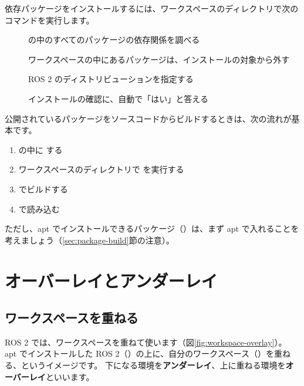 依存パッケージをインストールするには、ワークスペースのディレクトリで次のコマンドを実行します。


\begin{description}
  \item[]  の中のすべてのパッケージの依存関係を調べる
  \item[] ワークスペースの中にあるパッケージは、インストールの対象から外す
  \item[] ROS 2 のディストリビューションを指定する
  \item[] インストールの確認に、自動で「はい」と答える
\end{description}

\begin{point}[ソースからビルドするときの手順]
  公開されているパッケージをソースコードからビルドするときは、次の流れが基本です。
  \begin{enumerate}
    \item {} の中に  する
    \item ワークスペースのディレクトリで  を実行する
    \item {} でビルドする
    \item {} で読み込む
  \end{enumerate}
  ただし、apt でインストールできるパッケージ（）は、まず apt で入れることを考えましょう（\ref{sec:package-build}節の注意）。
\end{point}

\section{オーバーレイとアンダーレイ}
\label{sec:workspace-overlay}

\subsection{ワークスペースを重ねる}

ROS 2 では、ワークスペースを重ねて使います（図\ref{fig:workspace-overlay}）。
apt でインストールした ROS 2（）の上に、自分のワークスペース（）を重ねる、というイメージです。
下になる環境を\textbf{アンダーレイ}、上に重ねる環境を\textbf{オーバーレイ}といいます。

